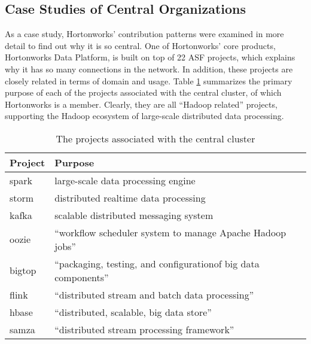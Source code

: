 \subsection{Case Studies of Central Organizations}
As a case study, Hortonworks' contribution patterns were examined in more detail to find out why it is so central. One of Hortonworks' core products, Hortonworks Data Platform, is built on top of 22 ASF projects\cite{hdp}, which explains why it has so many connections in the network. In addition, these projects are closely related in terms of domain and usage. Table \ref{tab:centralclusterprojects} summarizes the primary purpose of each of the projects associated with the central cluster, of which Hortonworks is a member. Clearly, they are all ``Hadoop related'' projects\cite{hadoopecosystem}, supporting the Hadoop ecosystem of large-scale distributed data processing.

\begin{table}
	\begin{tabular}{l|l}
		\bfseries Project & \bfseries Purpose \\
		\hline
		spark & large-scale data processing engine\cite{spark} \\
		storm & distributed realtime data processing\cite{storm} \\
		kafka & scalable distributed messaging system\cite{kafka} \\
		oozie & ``workflow scheduler system to manage Apache Hadoop jobs''\cite{oozie} \\
		bigtop & ``packaging, testing, and configuration\textellipsis{}of big data components''\cite{bigtop} \\
		flink & ``distributed stream and batch data processing''\cite{flink} \\
		hbase & ``distributed, scalable, big data store''\cite{hbase} \\
		samza & ``distributed stream processing framework''\cite{samza}
	\end{tabular}
	\centering
	\caption{The projects associated with the central cluster}\label{tab:centralclusterprojects}
\end{table}

